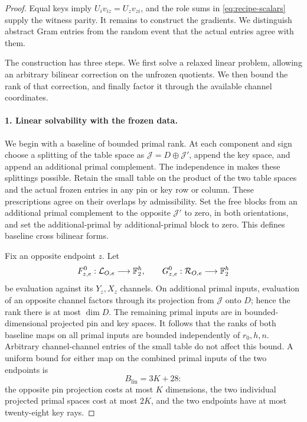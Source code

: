 \begin{proof}
Equal keys imply
$U_iv_{iz}=U_zv_{zi}$, and the role sums in
\eqref{eq:recipe-scalars} supply the witness parity.
It remains to construct the gradients.  We distinguish
abstract Gram entries from the random event that the actual
entries agree with them.

The construction has three steps.  We first solve a relaxed linear
problem, allowing an arbitrary bilinear correction on the unfrozen
quotients.  We then bound the rank of that correction, and finally
factor it through the available channel coordinates.

\paragraph{1. Linear solvability with the frozen data.}
We begin with a baseline of bounded primal rank.
At each component and sign choose a splitting of the table
space as $\mathcal J=D\oplus\mathcal J'$, append the key
space, and append an additional primal complement.
The independence in  makes these
splittings possible.  Retain the small table on the product
of the two table spaces and the actual frozen entries in any
pin or key row or column.  These prescriptions agree on their
overlaps by admissibility.  Set the free blocks from an
additional primal complement to the opposite $\mathcal J'$
to zero, in both orientations, and set the additional-primal
by additional-primal block to zero.  This defines baseline
cross bilinear forms.

Fix an opposite endpoint $z$.  Let
\[
 F^0_{z,e}:\mathcal L_{O,e}\longrightarrow\mathbb F_2^h,\qquad
 G^0_{z,e}:\mathcal R_{O,e}\longrightarrow\mathbb F_2^h
\]
be evaluation against its $Y_z,X_z$ channels.  On additional
primal inputs, evaluation of an opposite channel factors
through its projection from $\mathcal J$ onto $D$; hence the
rank there is at most $\dim D$.  The remaining primal inputs
are in bounded-dimensional projected pin and key spaces.
It follows that the ranks of both baseline maps on all primal
inputs are bounded independently of $r_0,h,n$.  Arbitrary
channel-channel entries of the small table do not affect this
bound.  A uniform bound for either map on the combined primal
inputs of the two endpoints is
\begin{equation}\label{eq:baseline-rank-bound}
 B_{\mathrm{lin}}=3K+28:
\end{equation}
the opposite pin projection costs at most $K$ dimensions,
the two individual projected primal spaces cost at most $2K$,
and the two endpoints have at most twenty-eight key rays.


\end{proof}
